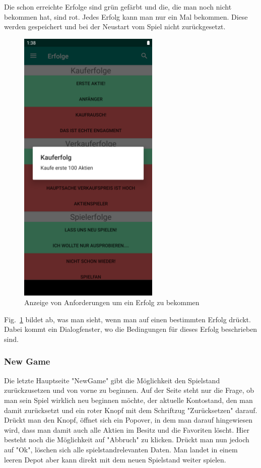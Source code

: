 \documentclass[10pt]{scrartcl}
\begin{document}
Die schon erreichte Erfolge sind grün gefärbt und die, die man noch nicht bekommen hat, sind rot. Jedes Erfolg kann man nur ein Mal bekommen. Diese werden gespeichert und bei der Neustart vom Spiel nicht zurückgesetzt.

\begin{figure}[H]
	\centering
	\includegraphics[width=0.6\textwidth]{Bilder/Applikation/erfolgeDetalien.png}
	\caption{Anzeige von Anforderungen um ein Erfolg zu bekommen}
	\label{erfolge2}
\end{figure}

Fig.~\ref{erfolge2} bildet ab, was man sieht, wenn man auf einen bestimmten Erfolg drückt. Dabei kommt ein Dialogfenster, wo die Bedingungen für dieses Erfolg beschrieben sind.

\subsubsection{New Game}

Die letzte Hauptseite "NewGame" gibt die Möglichkeit den Spielstand zurückzusetzen und von vorne zu beginnen. 
Auf der Seite steht nur die Frage, ob man sein Spiel wirklich neu beginnen möchte, der aktuelle Kontostand, den man damit zurücksetzt und ein roter Knopf mit dem Schriftzug "Zurücksetzen" darauf. Drückt man den Knopf, öffnet sich ein Popover, in dem man darauf hingewiesen wird, dass man damit auch alle Aktien im Besitz und die Favoriten löscht. Hier besteht noch die Möglichkeit auf "Abbruch" zu klicken. Drückt man nun jedoch auf "Ok", löschen sich alle spielstandrelevanten Daten. Man landet in einem leeren Depot aber kann direkt mit dem neuen Spielstand weiter spielen.
\end{document}
